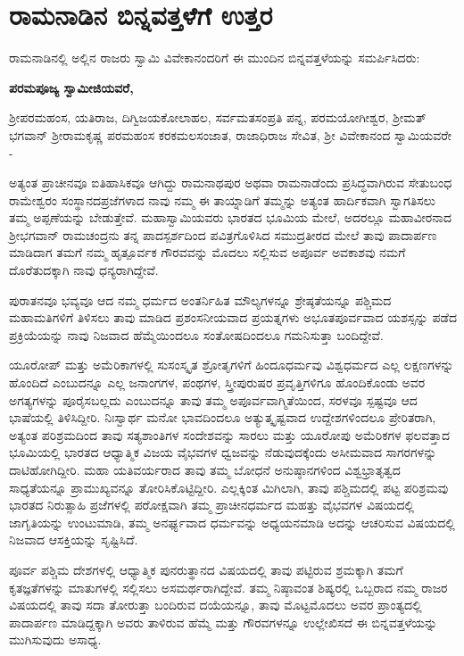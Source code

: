 
\chapter{ರಾಮನಾಡಿನ ಬಿನ್ನವತ್ತಳೆಗೆ ಉತ್ತರ}

ರಾಮನಾಡಿನಲ್ಲಿ ಅಲ್ಲಿನ ರಾಜರು ಸ್ವಾಮಿ ವಿವೇಕಾನಂದರಿಗೆ ಈ ಮುಂದಿನ ಬಿನ್ನವತ್ತಳೆಯನ್ನು ಸಮರ್ಪಿಸಿದರು:

\textbf{ಪರಮಪೂಜ್ಯ ಸ್ವಾಮೀಜಿಯವರೆ,}

ಶ‍್ರೀಪರಮಹಂಸ, ಯತಿರಾಜ, ದಿಗ್ವಿಜಯಕೋಲಾಹಲ, ಸರ್ವಮತ\break ಸಂಪ್ರತಿ ಪನ್ನ, ಪರಮಯೋಗೀಶ್ವರ, ಶ‍್ರೀಮತ್​ ಭಗವಾನ್​ ಶ‍್ರೀರಾಮಕೃಷ್ಣ ಪರಮಹಂಸ ಕರಕಮಲಸಂಜಾತ, ರಾಜಾಧಿರಾಜ ಸೇವಿತ, ಶ‍್ರೀ ವಿವೇಕಾನಂದ ಸ್ವಾಮಿಯವರೇ -

ಅತ್ಯಂತ ಪ್ರಾಚೀನವೂ ಐತಿಹಾಸಿಕವೂ ಆಗಿದ್ದು ರಾಮನಾಥಪುರ ಅಥವಾ ರಾಮನಾಡೆಂದು ಪ್ರಸಿದ್ಧವಾಗಿರುವ ಸೇತುಬಂಧ ರಾಮೇಶ್ವರಂ ಸಂಸ್ಥಾನದ\break ಪ್ರಜೆಗಳಾದ ನಾವು ನಮ್ಮ ಈ ತಾಯ್ನಾಡಿಗೆ ತಮ್ಮನ್ನು ಅತ್ಯಂತ ಹಾರ್ದಿಕವಾಗಿ ಸ್ವಾಗತಿಸಲು ತಮ್ಮ ಅಪ್ಪಣೆಯನ್ನು ಬೇಡುತ್ತೇವೆ. ಮಹಾಸ್ವಾಮಿಯವರು ಭಾರತದ ಭೂಮಿಯ ಮೇಲೆ, ಅದರಲ್ಲೂ ಮಹಾವೀರನಾದ ಶ‍್ರೀಭಗವಾನ್​ ರಾಮಚಂದ್ರನು ತನ್ನ ಪಾದಸ್ಪರ್ಶದಿಂದ ಪವಿತ್ರಗೊಳಿಸಿದ ಸಮುದ್ರತೀರದ ಮೇಲೆ ತಾವು ಪಾದಾರ್ಪಣ ಮಾಡಿದಾಗ ತಮಗೆ ನಮ್ಮ ಹೃತ್ಪೂರ್ವಕ ಗೌರವವನ್ನು ಮೊದಲು ಸಲ್ಲಿಸುವ ಅಪೂರ್ವ ಅವಕಾಶವು ನಮಗೆ ದೊರೆತುದಕ್ಕಾಗಿ ನಾವು ಧನ್ಯರಾಗಿದ್ದೇವೆ.

ಪುರಾತನವೂ ಭವ್ಯವೂ ಆದ ನಮ್ಮ ಧರ್ಮದ ಅಂತರ್ನಿಹಿತ ಮೌಲ್ಯಗಳನ್ನೂ ಶ್ರೇಷ್ಠತೆಯನ್ನೂ ಪಶ್ಚಿಮದ ಮಹಾಮತಿಗಳಿಗೆ ತಿಳಿಸಲು ತಾವು ಮಾಡಿದ ಪ್ರಶಂಸನೀಯವಾದ ಪ್ರಯತ್ನಗಳು ಅಭೂತಪೂರ್ವವಾದ ಯಶಸ್ಸನ್ನು ಪಡೆದ ಪ್ರಕ್ರಿಯೆಯನ್ನು ನಾವು ನಿಜವಾದ ಹೆಮ್ಮೆಯಿಂದಲೂ ಸಂತೋಷದಿಂದಲೂ ಗಮನಿಸುತ್ತಾ ಬಂದಿದ್ದೇವೆ.

ಯೂರೋಪ್​ ಮತ್ತು ಅಮೆರಿಕಾಗಳಲ್ಲಿ ಸುಸಂಸ್ಕೃತ ಶ್ರೋತೃಗಳಿಗೆ ಹಿಂದೂಧರ್ಮವು ವಿಶ್ವಧರ್ಮದ ಎಲ್ಲ ಲಕ್ಷಣಗಳನ್ನು ಹೊಂದಿದೆ ಎಂಬುದನ್ನೂ ಎಲ್ಲ ಜನಾಂಗಗಳ, ಪಂಥಗಳ, ಸ್ತ್ರೀಪುರುಷರ ಪ್ರವೃತ್ತಿಗಳಿಗೂ ಹೊಂದಿಕೊಂಡು ಅವರ ಅಗತ್ಯಗಳನ್ನು ಪೂರೈಸಬಲ್ಲದು ಎಂಬುದನ್ನೂ ತಾವು ತಮ್ಮ ಅಪೂರ್ವ\break ವಾಗ್ಮಿತೆಯಿಂದ, ಸರಳವೂ ಸ್ಪಷ್ಟವೂ ಆದ ಭಾಷೆಯಲ್ಲಿ ತಿಳಿಸಿದ್ದೀರಿ. ನಿಃಸ್ವಾರ್ಥ ಮನೋ ಭಾವದಿಂದಲೂ ಅತ್ಯುತ್ಕೃಷ್ಟವಾದ ಉದ್ದೇಶಗಳಿಂದಲೂ ಪ್ರೇರಿತರಾಗಿ, ಅತ್ಯಂತ ಪರಿಶ್ರಮದಿಂದ ತಾವು ಸತ್ಯಶಾಂತಿಗಳ ಸಂದೇಶವನ್ನು ಸಾರಲು ಮತ್ತು ಯೂರೋಪು ಅಮೆರಿಕಗಳ ಫಲವತ್ತಾದ ಭೂಮಿಯಲ್ಲಿ ಭಾರತದ ಆಧ್ಯಾತ್ಮಿಕ ವಿಜಯ ವೈಭವಗಳ ಧ್ವಜವನ್ನು ನೆಡುವುದಕ್ಕೆಂದು ಅಸೀಮವಾದ ಸಾಗರಗಳನ್ನು ದಾಟಿಹೋಗಿದ್ದೀರಿ. ಮಹಾ ಯತಿವರ್ಯರಾದ ತಾವು ತಮ್ಮ ಬೋಧನೆ ಅನುಷ್ಠಾನಗಳಿಂದ ವಿಶ್ವಭ್ರಾತೃತ್ವದ ಸಾಧ್ಯತೆಯನ್ನೂ ಪ್ರಾಮುಖ್ಯವನ್ನೂ ತೋರಿಸಿಕೊಟ್ಟಿದ್ದೀರಿ. ಎಲ್ಲಕ್ಕಿಂತ ಮಿಗಿಲಾಗಿ, ತಾವು ಪಶ್ಚಿಮದಲ್ಲಿ ಪಟ್ಟ ಪರಿಶ್ರಮವು ಭಾರತದ ನಿರುತ್ಸಾಹಿ ಪ್ರಜೆಗಳಲ್ಲಿ ಪರೋಕ್ಷವಾಗಿ ತಮ್ಮ ಪ್ರಾಚೀನಧರ್ಮದ ಮಹತ್ತು ವೈಭವಗಳ ವಿಷಯದಲ್ಲಿ ಜಾಗೃತಿಯನ್ನು ಉಂಟುಮಾಡಿ, ತಮ್ಮ ಅನರ್ಘ್ಯವಾದ ಧರ್ಮವನ್ನು ಅಧ್ಯಯನಮಾಡಿ ಅದನ್ನು ಆಚರಿಸುವ ವಿಷಯದಲ್ಲಿ ನಿಜವಾದ ಆಸಕ್ತಿಯನ್ನು ಸೃಷ್ಟಿಸಿದೆ.

ಪೂರ್ವ ಪಶ್ಚಿಮ ದೇಶಗಳಲ್ಲಿ ಆಧ್ಯಾತ್ಮಿಕ ಪುನರುತ್ಥಾನದ ವಿಷಯದಲ್ಲಿ ತಾವು ಪಟ್ಟಿರುವ ಶ್ರಮಕ್ಕಾಗಿ ತಮಗೆ ಕೃತಜ್ಞತೆಗಳನ್ನು ಮಾತುಗಳಲ್ಲಿ ಸಲ್ಲಿಸಲು ಅಸಮರ್ಥರಾಗಿದ್ದೇವೆ. ತಮ್ಮ ನಿಷ್ಠಾವಂತ ಶಿಷ್ಯರಲ್ಲಿ ಒಬ್ಬರಾದ ನಮ್ಮ ರಾಜರ ವಿಷಯದಲ್ಲಿ ತಾವು ಸದಾ ತೋರುತ್ತಾ ಬಂದಿರುವ ದಯೆಯನ್ನೂ, ತಾವು ಮೊಟ್ಟಮೊದಲು ಅವರ ಪ್ರಾಂತ್ಯದಲ್ಲಿ ಪಾದಾರ್ಪಣ ಮಾಡಿದ್ದಕ್ಕಾಗಿ ಅವರು ತಾಳಿರುವ ಹೆಮ್ಮೆ ಮತ್ತು ಗೌರವಗಳನ್ನೂ ಉಲ್ಲೇಖಿಸದೆ ಈ ಬಿನ್ನವತ್ತಳೆಯನ್ನು ಮುಗಿಸುವುದು ಅಸಾಧ್ಯ.

